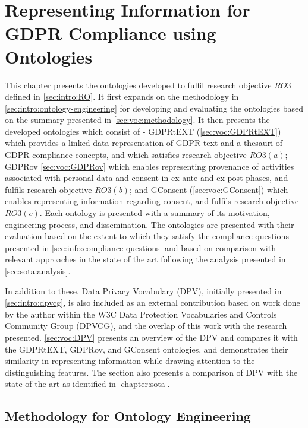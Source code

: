 \chapter{Representing Information for GDPR Compliance using Ontologies}
\label{chapter:vocabularies}

This chapter presents the ontologies developed to fulfil research objective $RO3$ defined in \autoref{sec:intro:RO}.
It first expands on the methodology in \autoref{sec:intro:ontology-engineering} for developing and evaluating the ontologies based on the summary presented in \autoref{sec:voc:methodology}.
It then presents the developed ontologies which consist of - GDPRtEXT (\autoref{sec:voc:GDPRtEXT}) which provides a linked data representation of GDPR text and a thesauri of GDPR compliance concepts, and which satisfies research objective $RO3(a)$; GDPRov \autoref{sec:voc:GDPRov} which enables representing provenance of activities associated with personal data and consent in ex-ante and ex-post phases, and fulfils research objective $RO3(b)$; and GConsent (\autoref{sec:voc:GConsent}) which enables representing information regarding consent, and fulfils research objective $RO3(c)$.
Each ontology is presented with a summary of its motivation, engineering process, and dissemination. The ontologies are presented with their evaluation based on the extent to which they satisfy the compliance questions presented in \autoref{sec:info:compliance-questions} and based on comparison with relevant approaches in the state of the art following the analysis presented in \autoref{sec:sota:analysis}.

In addition to these, Data Privacy Vocabulary (DPV), initially presented in \autoref{sec:intro:dpvcg}, is also included as an external contribution based on work done by the author within the W3C Data Protection Vocabularies and Controls Community Group (DPVCG), and the overlap of this work with the research presented. \autoref{sec:voc:DPV} presents an overview of the DPV and compares it with the GDPRtEXT, GDPRov, and GConsent ontologies, and demonstrates their similarity in representing information while drawing attention to the distinguishing features.
The section also presents a comparison of DPV with the state of the art as identified in \autoref{chapter:sota}.

\section{Methodology for Ontology Engineering}\label{sec:voc:methodology}


